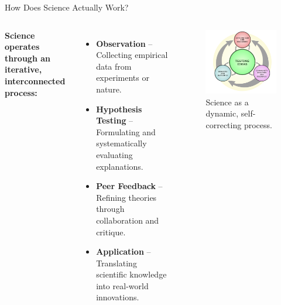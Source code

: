 \begin{frame}{How Does Science Actually Work?}
	\begin{columns}

		\textbf{Science operates through an iterative, interconnected process:}

		\vspace{0.3cm}
		\begin{itemize}
			\item \textbf{Observation} – Collecting empirical data from experiments or nature.
			\item \textbf{Hypothesis Testing} – Formulating and systematically evaluating explanations.
			\item \textbf{Peer Feedback} – Refining theories through collaboration and critique.
			\item \textbf{Application} – Translating scientific knowledge into real-world innovations.
		\end{itemize}

		\begin{figure}
			\centering
			\includegraphics[width=\textwidth]{Figures/canvas.png}
			\caption{Science as a dynamic, self-correcting process. \cite{Science}}
		\end{figure}

	\end{columns}
\end{frame}


